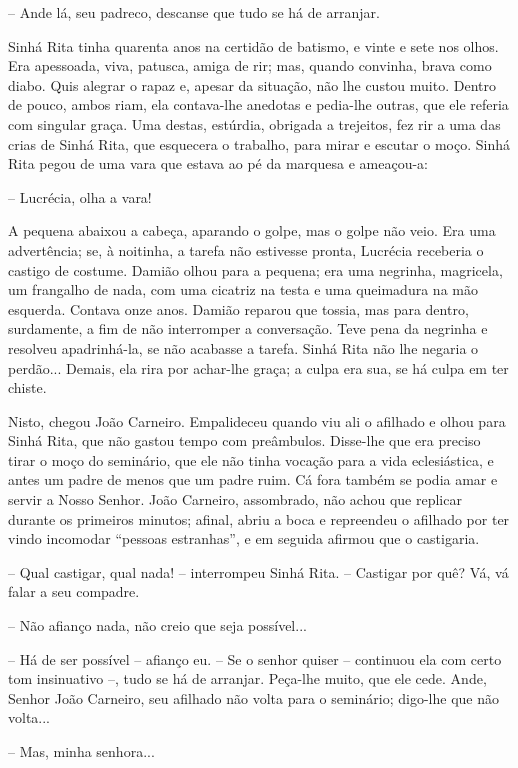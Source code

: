 -- Ande lá, seu padreco, descanse que tudo se há de arranjar.

Sinhá Rita tinha quarenta anos na certidão de batismo, e vinte e sete
nos olhos. Era apessoada, viva, patusca, amiga de rir; mas, quando
convinha, brava como diabo. Quis alegrar o rapaz e, apesar da situação,
não lhe custou muito. Dentro de pouco, ambos riam, ela contava-lhe
anedotas e pedia-lhe outras, que ele referia com singular graça. Uma
destas, estúrdia, obrigada a trejeitos, fez rir a uma das crias de Sinhá
Rita, que esquecera o trabalho, para mirar e escutar o moço. Sinhá Rita
pegou de uma vara que estava ao pé da marquesa e ameaçou-a:

-- Lucrécia, olha a vara!

A pequena abaixou a cabeça, aparando o golpe, mas o golpe não veio. Era
uma advertência; se, à noitinha, a tarefa não estivesse pronta, Lucrécia
receberia o castigo de costume. Damião olhou para a pequena; era uma
negrinha, magricela, um frangalho de nada, com uma cicatriz na testa e
uma queimadura na mão esquerda. Contava onze anos. Damião reparou que
tossia, mas para dentro, surdamente, a fim de não interromper a
conversação. Teve pena da negrinha e resolveu apadrinhá-la, se não
acabasse a tarefa. Sinhá Rita não lhe negaria o perdão... Demais, ela
rira por achar-lhe graça; a culpa era sua, se há culpa em ter chiste.

Nisto, chegou João Carneiro. Empalideceu quando viu ali o afilhado e
olhou para Sinhá Rita, que não gastou tempo com preâmbulos. Disse-lhe
que era preciso tirar o moço do seminário, que ele não tinha vocação
para a vida eclesiástica, e antes um padre de menos que um padre ruim.
Cá fora também se podia amar e servir a Nosso Senhor. João Carneiro,
assombrado, não achou que replicar durante os primeiros minutos; afinal,
abriu a boca e repreendeu o afilhado por ter vindo incomodar ``pessoas
estranhas'', e em seguida afirmou que o castigaria.

-- Qual castigar, qual nada! -- interrompeu Sinhá Rita. -- Castigar por
quê? Vá, vá falar a seu compadre.

-- Não afianço nada, não creio que seja possível...

-- Há de ser possível -- afianço eu. -- Se o senhor quiser -- continuou
ela com certo tom insinuativo --, tudo se há de arranjar. Peça-lhe
muito, que ele cede. Ande, Senhor João Carneiro, seu afilhado não volta
para o seminário; digo-lhe que não volta...

-- Mas, minha senhora...

